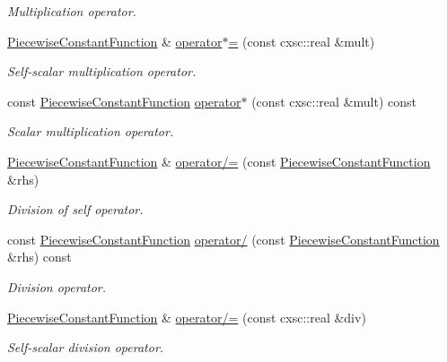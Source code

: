 \begin{DoxyCompactItemize}
\begin{DoxyCompactList}\small\item\em \-Multiplication operator. \end{DoxyCompactList}\item 
\hyperlink{classsubpavings_1_1PiecewiseConstantFunction}{\-Piecewise\-Constant\-Function} \& \hyperlink{classsubpavings_1_1PiecewiseConstantFunction_aa7c90fe41fba228dbe5cbe01878e1d54}{operator$\ast$=} (const cxsc\-::real \&mult)
\begin{DoxyCompactList}\small\item\em \-Self-\/scalar multiplication operator. \end{DoxyCompactList}\item 
const \hyperlink{classsubpavings_1_1PiecewiseConstantFunction}{\-Piecewise\-Constant\-Function} \hyperlink{classsubpavings_1_1PiecewiseConstantFunction_a2c2c76a16d5ca85d74e00a61502f31d5}{operator$\ast$} (const cxsc\-::real \&mult) const 
\begin{DoxyCompactList}\small\item\em \-Scalar multiplication operator. \end{DoxyCompactList}\item 
\hyperlink{classsubpavings_1_1PiecewiseConstantFunction}{\-Piecewise\-Constant\-Function} \& \hyperlink{classsubpavings_1_1PiecewiseConstantFunction_a6167942675f27eaab9a2b858375d9bf9}{operator/=} (const \hyperlink{classsubpavings_1_1PiecewiseConstantFunction}{\-Piecewise\-Constant\-Function} \&rhs)
\begin{DoxyCompactList}\small\item\em \-Division of self operator. \end{DoxyCompactList}\item 
const \hyperlink{classsubpavings_1_1PiecewiseConstantFunction}{\-Piecewise\-Constant\-Function} \hyperlink{classsubpavings_1_1PiecewiseConstantFunction_a3bdc0d055a65d5785c87f77ae30b2512}{operator/} (const \hyperlink{classsubpavings_1_1PiecewiseConstantFunction}{\-Piecewise\-Constant\-Function} \&rhs) const 
\begin{DoxyCompactList}\small\item\em \-Division operator. \end{DoxyCompactList}\item 
\hyperlink{classsubpavings_1_1PiecewiseConstantFunction}{\-Piecewise\-Constant\-Function} \& \hyperlink{classsubpavings_1_1PiecewiseConstantFunction_a43f950b15d9de80ae4e88353f9d63abb}{operator/=} (const cxsc\-::real \&div)
\begin{DoxyCompactList}\small\item\em \-Self-\/scalar division operator. \end{DoxyCompactList}\item 

\end{DoxyCompactItemize}
